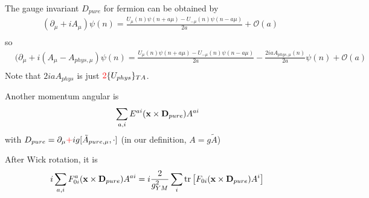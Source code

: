 The gauge invariant $D_{pure}$ for fermion can be obtained by
\begin{equation}
\begin{split}
&(\partial _{\mu}+iA_{\mu})\psi(n)= \frac{U_{\mu}(n)\psi(n+a\mu)-U_{-\mu}(n)\psi(n-a\mu)}{2a}+\mathcal{O}(a)\\
\end{split}
\end{equation}
so
\begin{equation}
\begin{split}
&(\partial _{\mu}+i(A_{\mu}-A_{phys,\mu})\psi(n)= \frac{U_{\mu}(n)\psi(n+a\mu)-U_{-\mu}(n)\psi(n-a\mu)}{2a}-\frac{2iaA_{phys,\mu}(n)}{2a}\psi (n)+\mathcal{O}(a)\\
\end{split}
\end{equation}
Note that $2iaA_{phys}$ is just $\textcolor[rgb]{1,0,0}{2}\{U_{phys}\}_{TA}$.

Another momentum angular is
\begin{equation}
\begin{split}
&\sum _{a,i}E^{ai}({\bf x}\times {\bf D}_{pure})A^{ai}\\
\end{split}
\end{equation}
with $D_{pure}=\partial _{\mu}\textcolor[rgb]{1,0,0}{+}ig[\tilde{A}_{pure,\mu},\cdot]$ (in our definition, $A=g\tilde{A}$)

After Wick rotation, it is
\begin{equation}
\begin{split}
&i\sum _{a,i}F^a_{0i}({\bf x}\times {\bf D}_{pure})A^{ai}=i\frac{2}{g^2_{YM}}\sum _i{\rm tr}\left[F_{0i}({\bf x}\times {\bf D}_{pure})A^{i}\right]\\
\end{split}
\end{equation}

